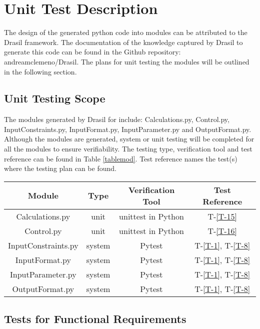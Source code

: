 \documentclass[12pt, titlepage]{article}
\newcommand{\tinref}[1]{T-\ref{#1}}
\begin{document}
\section{Unit Test Description} \label{unittestcases}


The design of the generated python code into modules can be attributed to the 
Drasil framework. The documentation of the knowledge captured by Drasil to 
generate this code can be found in the Github repository: andreamclemeno/Drasil. 
The plans for unit testing the modules will be outlined in the following 
section.


\subsection{Unit Testing Scope}

The modules generated by Drasil for \progname{} include: Calculations.py, 
Control.py, InputConstraints.py, InputFormat.py, InputParameter.py and 
OutputFormat.py. Although the modules are generated, system or unit testing will 
be completed for all the modules to ensure verifiability. The testing type, 
verification tool and test reference can be found in Table \ref{tablemod}. Test 
reference names the test(s) where the testing plan can be found.

\begin{center}
 \begin{tabular}{||c|c|c|c||} 
 \hline
 Module & Type & Verification Tool & Test Reference \\ [0.5ex] 
 \hline
  Calculations.py & unit & unittest in Python & \tinref{T-15}\\
  \hline
  Control.py & unit & unittest in Python & \tinref{T-16}\\
  \hline
  InputConstraints.py & system & Pytest & \tinref{T-1}, \tinref{T-8}\\
  \hline
  InputFormat.py & system & Pytest & \tinref{T-1}, \tinref{T-8}\\
  \hline
  InputParameter.py & system & Pytest & \tinref{T-1}, \tinref{T-8}\\
  \hline
  OutputFormat.py & system & Pytest & \tinref{T-1}, \tinref{T-8}\\
 \hline
\end{tabular}
\label{tablemod}

\end{center}	


\subsection{Tests for Functional Requirements}\label{utnfr}
\end{document}
